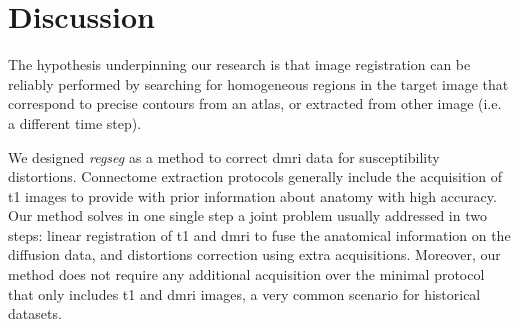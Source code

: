 \section{Discussion}
\label{sec:discussion}

The hypothesis underpinning our research is that image registration can be reliably performed
  by searching for homogeneous regions in the target image that correspond to precise contours
  from an atlas, or extracted from other image (i.e. a different time step).


We designed \emph{regseg} as a method to correct \gls*{dmri} data for susceptibility
  distortions.
Connectome extraction protocols generally include the acquisition of \gls*{t1} images
  to provide with prior information about anatomy with high accuracy.
Our method solves in one single step a joint problem usually addressed in two steps:
  linear registration of \gls*{t1} and \gls*{dmri} to fuse the anatomical information on
  the diffusion data, and distortions correction using extra acquisitions.
Moreover, our method does not require any additional acquisition over the minimal protocol
  that only includes \gls*{t1} and \gls*{dmri} images, a very common scenario for
  historical datasets.

